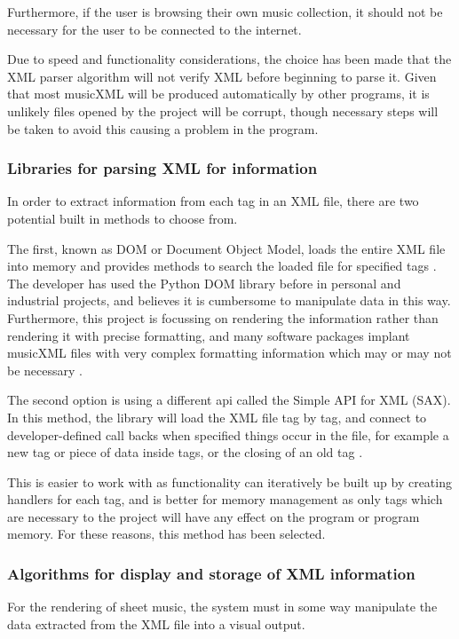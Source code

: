 Furthermore, if the user is browsing their own music collection, it should not be necessary for the user to be connected to the internet.

Due to speed and functionality considerations, the choice has been made that the XML parser algorithm will not verify XML before beginning to parse it. Given that most musicXML will be produced automatically by other programs, it is unlikely files opened by the project will be corrupt, though necessary steps will be taken to avoid this causing a problem in the program.


\subsubsection{Libraries for parsing XML for information}
In order to extract information from each tag in an XML file, there are two potential built in methods to choose from. 

The first, known as DOM or Document Object Model, loads the entire XML file into memory and provides methods to search the loaded file for specified tags \parencite{PythonDom}. The developer has used the Python DOM library before in personal and industrial projects, and believes it is cumbersome to manipulate data in this way. Furthermore, this project is focussing on rendering the information rather than rendering it with precise formatting, and many software packages implant musicXML files with very complex formatting information which may or may not be necessary \parencite{MusicXMLPresentation}.

The second option is using a different api called the Simple API for XML (SAX). In this method, the library will load the XML file tag by tag, and connect to developer-defined call backs when specified things occur in the file, for example a new tag or piece of data inside tags, or the closing of an old tag \parencite{PythonSax}. 

This is easier to work with as functionality can iteratively be built up by creating handlers for each tag, and is better for memory management as only tags which are necessary to the project will have any effect on the program or program memory. For these reasons, this method has been selected.



\subsubsection{Algorithms for display and storage of XML information}
For the rendering of sheet music, the system must in some way manipulate the data extracted from the XML file into a visual output.

